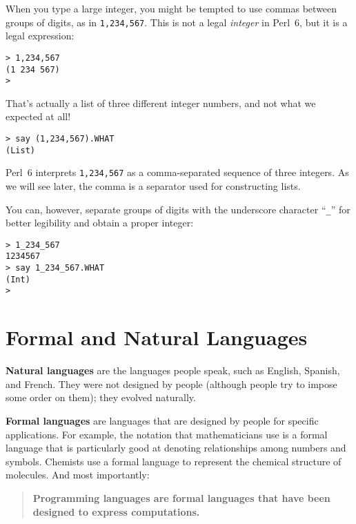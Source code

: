 When you type a large integer, you might be tempted to use commas
between groups of digits, as in {\tt 1,234,567}.  This is not a
legal {\em integer} in Perl~6, but it is a legal expression:

\begin{verbatim}
> 1,234,567
(1 234 567)
>
\end{verbatim}
%
That's actually a list of three different integer numbers, and 
not what we expected at all! 

\begin{verbatim}
> say (1,234,567).WHAT
(List)
\end{verbatim}

Perl~6 interprets {\tt 1,234,567} as a comma-separated 
sequence of three integers.  As we will see later, 
the comma is a separator used for constructing lists.

You can, however, separate groups of digits with the underscore character ``\verb"_"'' for better legibility and obtain a 
proper integer:

\begin{verbatim}
> 1_234_567
1234567
> say 1_234_567.WHAT
(Int)
>
\end{verbatim}
%




\section{Formal and Natural Languages}

{\bf Natural languages} are the languages people speak,
such as English, Spanish, and French.  They were not designed
by people (although people try to impose some order on them);
they evolved naturally.

{\bf Formal languages} are languages that are designed by people for
specific applications.  For example, the notation that mathematicians
use is a formal language that is particularly good at denoting
relationships among numbers and symbols.  Chemists use a formal
language to represent the chemical structure of molecules.  And
most importantly:

\begin{quote}
{\bf Programming languages are formal languages that have been
designed to express computations.}
\end{quote}

